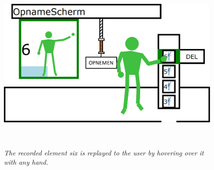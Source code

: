 \begin{figure}[H]
	\begin{center}
		\includegraphics[width=16cm, height=9cm]{figures/11_replay_recording.png}
		\caption{\emph{The recorded element six is replayed to the user by hovering over it with any hand.}}
		\label{replay of element six}
	\end{center}
\end{figure}

